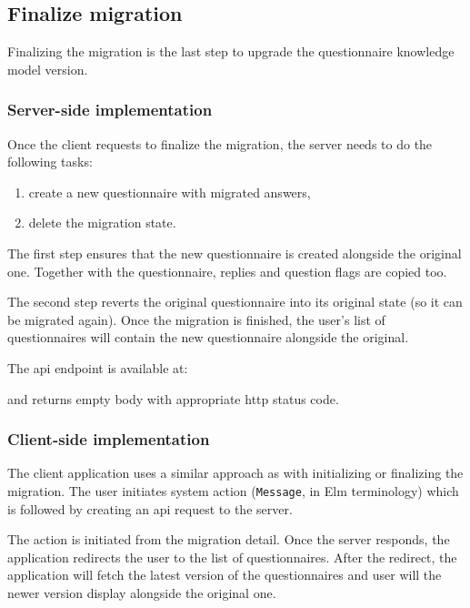 \subsection{Finalize migration}

Finalizing the migration is the last step to upgrade the questionnaire knowledge model version.

\subsubsection*{Server-side implementation}

Once the client requests to finalize the migration, the server needs to do the following tasks:

\begin{enumerate}
    \item create a new questionnaire with migrated answers,
    \item delete the migration state.
\end{enumerate}

The first step ensures that the new questionnaire is created alongside the original one.
Together with the questionnaire, replies and question flags are copied too.

The second step reverts the original questionnaire into its original state (so it can be migrated again).
Once the migration is finished, the user's list of questionnaires will contain the new questionnaire alongside the original.

The \gls{api} endpoint is available at:

\begin{center}
\end{center}

and returns empty body with appropriate \gls{http} status code.

\subsubsection*{Client-side implementation}

The client application uses a similar approach as with initializing or finalizing the migration.
The user initiates system action (\texttt{Message}, in Elm terminology) which is followed by creating an \gls{api} request to the server.

The action is initiated from the migration detail.
Once the server responds, the application redirects the user to the list of questionnaires.
After the redirect, the application will fetch the latest version of the questionnaires and user will the newer version display alongside the original one.
